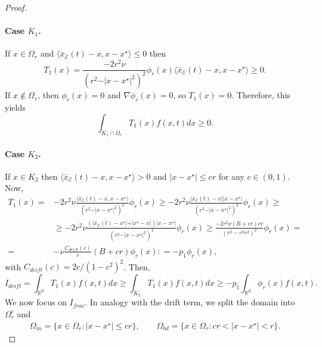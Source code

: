 \documentclass[11pt,handout]{article}%
\numberwithin{equation}{section}
\theoremstyle{definition}
\def\RR{\mathbb R}
\begin{document}
\begin{proof}
	\paragraph{Case $K_1$.} 
	If $x\in \Omega_r$ and $\langle \bar{x}_\mathcal{E}(t)-x, x-x^\star\rangle\leq 0$ then 
	\begin{equation*}
		T_1(x) = \frac{-2 r^2 \nu}{(r^2 - \vert x-x^\star \vert^2)^2} \phi_r(x) \langle \bar{x}_\mathcal{E}(t)-x, x-x^\star\rangle \geq 0.
	\end{equation*}
	If $x \not \in \Omega_r$, then $\phi_r(x) = 0$ and $\nabla \phi_r(x)=0$, so $T_1(x)=0$. 
	Therefore, this yields
	\begin{equation*}
		\int_{K_1\cap \Omega_r} T_1(x) f(x,t) dx \geq 0. 
	\end{equation*}
	\paragraph{Case $K_2$.} If $x\in K_2$ then $\langle \bar{x}_\mathcal{E}(t)-x, x-x^\star\rangle> 0$ and $\vert x-x^\star \vert \leq cr$ for any $c\in (0,1)$.
	Now,
	\begin{equation*}
		\begin{split}
			T_1(x) = & -2 r^2 \nu \frac{\langle \bar{x}_\mathcal{E}(t)-x, x-x^\star\rangle}{(r^2-\vert x-x^\star\vert ^2)^2}\phi_r(x) \geq -2 r^2 \nu \frac{\vert \bar{x}_\mathcal{E}(t)-x\vert \vert x-x^\star\vert}{(r^2-\vert x-x^\star\vert ^2)^2} \phi_r(x) \geq \\ 
			& \geq -2 r^2 \nu \frac{\left( \vert \bar{x}_\mathcal{E}(t)-x^\star\vert + \vert x^\star - x \vert \right) \vert x-x^\star\vert}{(r^2-\vert x-x^\star\vert ^2)^2} \phi_r(x) \geq \frac{-2r^2\nu (B+cr) cr}{(r^2-c^2r^2)^2}\phi_r(x) = \\
			= & -\nu \frac{C_{drift}(c)}{r} (B+cr) \phi_r(x) : = -p_1 \phi_r(x),
		\end{split}
	\end{equation*}
	with $C_{drift}(c) = 2c/(1-c^2)^2$. Then, 
	\begin{equation}\label{eq:I_drift}
		I_{drift} = \int_{\RR^d} T_1(x) f(x,t) dx \geq \int_{K_2} T_1(x) f(x,t)dx \geq -p_1 \int_{\RR^d} \phi_r(x) f(x,t).
	\end{equation}
	We now focus on $I_{frac}$. 
	In analogy with the drift term, we split the domain into $\Omega_r^c$ and 
	\begin{align*}
		\Omega_{in} = \{x \in \Omega_r : \vert x-x^\star \vert \leq cr\}, \qquad
		\Omega_{bd} = \{x \in \Omega_r : cr< \vert x-x^\star \vert <r\}. 
	\end{align*}

\end{proof}
\end{document}
